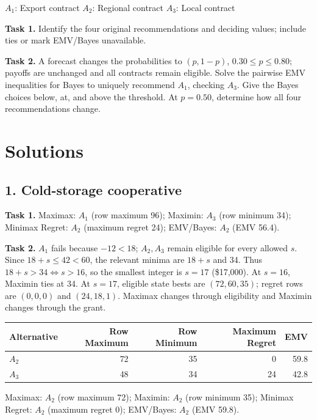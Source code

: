 \begin{studentproblem}
\begin{center}
	\vspace{2mm}
	\footnotesize
	$A_1$: Export contract \quad
	$A_2$: Regional contract \quad
	$A_3$: Local contract
	\endgroup
\end{center}
\textbf{Task 1.} Identify the four original recommendations and deciding values; include ties or mark EMV/Bayes unavailable.

\textbf{Task 2.} A forecast changes the probabilities to $(p,1-p)$, $0.30\leq p\leq0.80$; payoffs are unchanged and all contracts remain eligible. Solve the pairwise EMV inequalities for Bayes to uniquely recommend $A_1$, checking $A_3$. Give the Bayes choices below, at, and above the threshold. At $p=0.50$, determine how all four recommendations change.
\tasktwobox
\end{studentproblem}

\endgroup
\restoregeometry
\renewcommand{\baselinestretch}{1}\normalsize
\section*{Solutions}
\subsection*{1. Cold-storage cooperative}
\textbf{Task 1.} Maximax: $A_1$ (row maximum 96); Maximin: $A_3$ (row minimum 34); Minimax Regret: $A_2$ (maximum regret 24); EMV/Bayes: $A_2$ (EMV 56.4).

\textbf{Task 2.} $A_1$ fails because $-12<18$; $A_2,A_3$ remain eligible for every allowed $s$. Since $18+s\leq42<60$, the relevant minima are $18+s$ and 34. Thus $18+s>34\iff s>16$, so the smallest integer is $s=17$ (\$17,000). At $s=16$, Maximin ties at 34. At $s=17$, eligible state bests are $(72,60,35)$; regret rows are $(0,0,0)$ and $(24,18,1)$. Maximax changes through eligibility and Maximin changes through the grant.

\begin{center}\begin{tabular}{lrrrr}\toprule Alternative & Row Maximum & Row Minimum & Maximum Regret & EMV\\\midrule
$A_2$ & 72 & 35 & 0 & 59.8\\
$A_3$ & 48 & 34 & 24 & 42.8\\
\bottomrule\end{tabular}\end{center}
Maximax: $A_2$ (row maximum 72); Maximin: $A_2$ (row minimum 35); Minimax Regret: $A_2$ (maximum regret 0); EMV/Bayes: $A_2$ (EMV 59.8).

